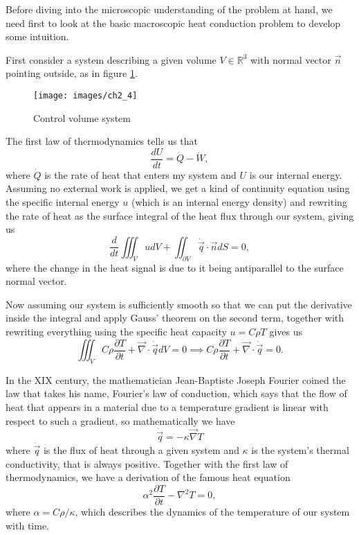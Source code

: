 Before diving into the microscopic understanding of the problem at hand, we need first to look at the basic macroscopic heat conduction problem to develop some intuition.

First consider a system describing a given volume $ V \in  \mathbb{R}^{3} $ with normal vector $ \vec{n} $ pointing outside, as in figure \ref{fig:ch2_4}.

\begin{figure}[htpb]
	\centering
	\texttt{[image: images/ch2\_4]}
	\caption{Control volume system}
	\label{fig:ch2_4}
\end{figure}

The first law of thermodynamics tells us that 
\[ 
\frac{dU }{dt } = \dot{Q} - \dot{W},
\]
where $ \dot{Q} $ is the rate of heat that enters my system and $ U $ is our internal energy. Assuming no external work is applied, we get a kind of continuity equation using the specific internal energy $ u $ (which is an internal energy density) and rewriting the rate of heat as the surface integral of the heat flux through our system, giving us
\[ 
\frac{d }{dt } \iiint_{V} u dV  
+ \iint_{\partial V} \dot{\vec{q}}\cdot \vec{n} dS = 0,
\]
where the change in the heat signal is due to it being antiparallel to the surface normal vector.

Now assuming our system is sufficiently smooth so that we can put the derivative inside the integral and apply Gauss' theorem on the second term, together with rewriting everything using the specific heat capacity $ u=C\rho T $ gives us
\[
\iiint_{V} C\rho\frac{\partial T }{\partial t } + \vec{\nabla} \cdot \dot{\vec{q}}dV = 0
\implies C\rho\frac{\partial T }{\partial t } 
+ \vec{\nabla} \cdot \dot{\vec{q}}=0.
\]

In the XIX century, the mathematician Jean-Baptiste Joseph Fourier 
coined the law that takes his name, Fourier's law of conduction, which says that the flow of heat that appears in a material due to a temperature gradient is linear with respect to such a gradient, so mathematically we have
\[ 
\dot{\vec{q}} = -\kappa \vec{\nabla} T
\]
where $ \dot{\vec{q}} $ is the flux of heat through a given system and $ \kappa $ is the system's thermal conductivity, that is always positive. Together with the first law of thermodynamics, we have a derivation of the famous heat equation
\[ 
\alpha^{2} \frac{\partial T }{\partial t } - \nabla^{2} T = 0,
\]
where $ \alpha =  C\rho/\kappa$, which describes the dynamics of the temperature of our system with time.

